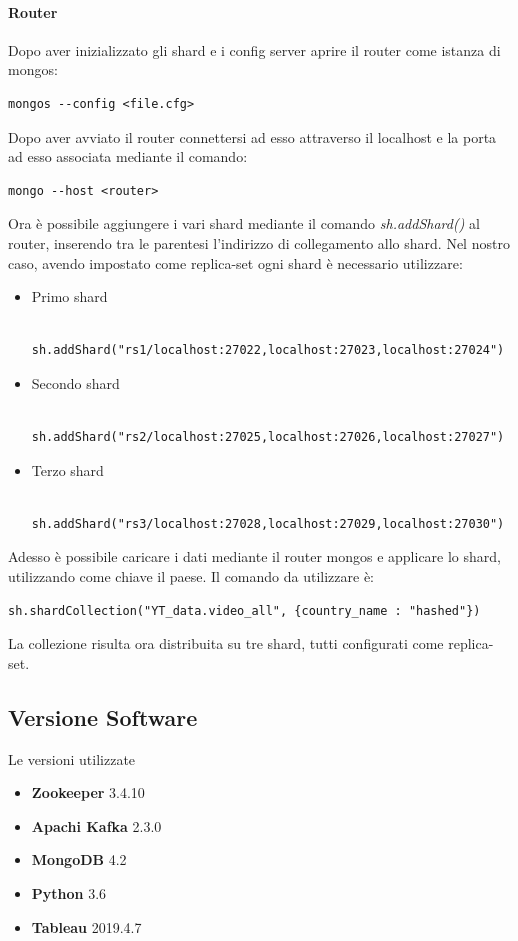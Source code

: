 \documentclass[10pt, a4paper,openany]{article}
\begin{document}
\paragraph{Router\\}
Dopo aver inizializzato gli shard e i config server aprire il router come istanza di mongos:

\begin{Verbatim}
mongos --config <file.cfg>
\end{Verbatim}

Dopo aver avviato il router connettersi ad esso attraverso il localhost e la porta ad esso associata mediante il comando:

\begin{Verbatim}
mongo --host <router>
\end{Verbatim}

Ora è possibile aggiungere i vari shard mediante il comando \textit{sh.addShard()} al router, inserendo tra le parentesi l'indirizzo di collegamento allo shard. Nel nostro caso, avendo impostato come replica-set ogni shard è necessario utilizzare:
\begin{itemize}
	\item Primo shard
	\begin{Verbatim}
	sh.addShard("rs1/localhost:27022,localhost:27023,localhost:27024")
	\end{Verbatim}
	\item Secondo shard
	\begin{Verbatim}
	sh.addShard("rs2/localhost:27025,localhost:27026,localhost:27027")
	\end{Verbatim}
	\item Terzo shard
	\begin{Verbatim}
	sh.addShard("rs3/localhost:27028,localhost:27029,localhost:27030")
	\end{Verbatim}
\end{itemize}

Adesso è possibile caricare i dati mediante il router mongos e applicare lo shard, utilizzando come chiave il paese. Il comando da utilizzare è:

\begin{Verbatim}
sh.shardCollection("YT_data.video_all", {country_name : "hashed"})
\end{Verbatim}

La collezione risulta ora distribuita su tre shard, tutti configurati come replica-set.

\subsection*{Versione Software}
Le versioni utilizzate
\begin{itemize}
	\item \textbf{Zookeeper} 3.4.10
	\item \textbf{Apachi Kafka} 2.3.0
	\item \textbf{MongoDB} 4.2
	\item \textbf{Python} 3.6
	\item \textbf{Tableau} 2019.4.7
\end{itemize}
\end{document}
